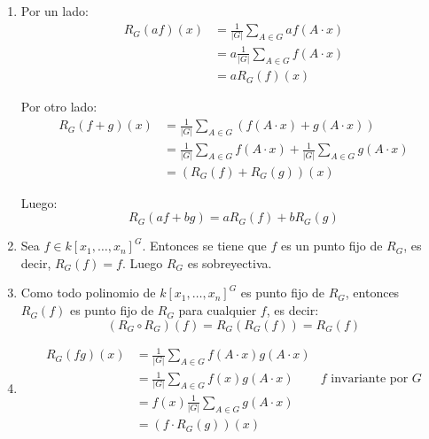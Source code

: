 \documentclass[twoside]{article}
\begin{document}
\begin{solucion}
\mbox{}
\begin{enumerate}
\item Por un lado:
\begin{align*}
R_G(a f)(x) & = \frac{1}{|G|} \sum_{A \in G} af(A \cdot x)\\
& = a \frac{1}{|G|} \sum_{A \in G} f(A \cdot x)\\
& = a R_G(f)(x)
\end{align*}

Por otro lado:
\begin{align*}
R_G(f + g)(x) & = \frac{1}{|G|} \sum_{A \in G} \left(f(A \cdot x) + g(A \cdot x)\right)\\
& = \frac{1}{|G|} \sum_{A \in G} f(A \cdot x) + \frac{1}{|G|} \sum_{A \in G} g(A \cdot x)\\
& = (R_G(f) + R_G(g))(x)
\end{align*}

Luego:
\[ R_G(a f + b g) = a R_G(f) + b R_G(g) \]

\item Sea $f \in k[x_1,\dots,x_n]^G$.
Entonces se tiene que $f$ es un punto fijo de $R_G$, es decir, $R_G(f) = f$.
Luego $R_G$ es sobreyectiva.

\item Como todo polinomio de $k[x_1,\dots,x_n]^G$ es punto fijo de $R_G$, entonces $R_G(f)$ es punto fijo de $R_G$ para cualquier $f$, es decir:
\[ (R_G \circ R_G)(f) = R_G(R_G(f)) = R_G(f) \]

\item 
\begin{align*}
R_G(f g)(x) & = \frac{1}{|G|} \sum_{A \in G} f(A \cdot x) g(A \cdot x)& \\
& = \frac{1}{|G|} \sum_{A \in G} f(x) g(A \cdot x) & f\text{ invariante por }G\\
& = f(x) \frac{1}{|G|} \sum_{A \in G} g(A \cdot x)\\
& = (f \cdot R_G(g))(x)
\end{align*}
\end{enumerate}
\end{solucion}
\end{document}
